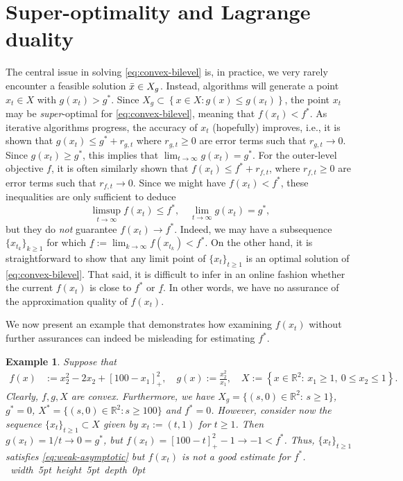 \documentclass[11pt,oneside]{article}
\theoremstyle{plain}
\theoremstyle{plain}
\newtheorem{example}{Example}
\theoremstyle{plain}%
\newcommand{\epr}{\hfill\hbox{\hskip 4pt \vrule width 5pt height 5pt depth 0pt}\vspace{0.0cm}\par}
\newcommand{\set}[1]{\left\{#1\right\}}
\def\R{{\mathbb{R}}}
\def\bbR{{\mathbb{R}}}
\begin{document}
{\section{Super-optimality and Lagrange duality}\label{sec:lagrange-dual}

The central issue in solving \cref{eq:convex-bilevel} is, in practice, we very rarely encounter a feasible solution $\Bar{x} \in X_g$. Instead, algorithms will generate a point $x_t \in X$ with $g(x_t) > g^*$. Since $X_g \subset \left\{ x \in X : g(x) \leq g(x_t) \right\}$, the point $x_t$ may be \emph{super}-optimal for \cref{eq:convex-bilevel}, meaning that $f(x_t) < f^*$. As iterative algorithms progress, the accuracy of $x_t$ (hopefully) improves, i.e., it is shown that $g(x_t) \leq g^* + r_{g,t}$ where $r_{g,t} \geq 0$ are error terms such that $r_{g,t} \to 0$. Since $g(x_t) \geq g^*$, this implies that $\lim_{t \to \infty} g(x_t) = g^*$. For the outer-level objective $f$, it is often similarly shown that $f(x_t) \leq f^* + r_{f,t}$, where $r_{f,t} \geq 0$ are error terms such that $r_{f,t} \to 0$. Since we might have $f(x_t) < f^*$, these inequalities are only sufficient to deduce
\begin{equation} \label{eq:weak-asymptotic}
\limsup_{t \to \infty} f(x_t)\leq f^*, \quad \lim_{t \to \infty} g(x_t) = g^*,
\end{equation}
but they do \emph{not} guarantee $f(x_t) \to f^*$. Indeed, we may have a subsequence $\{x_{t_k}\}_{k \geq 1}$ for which $\underline{f} := \lim_{k \to \infty} f(x_{t_k}) < f^*$. On the other hand, it is straightforward to show that any limit point of $\{x_t\}_{t \geq 1}$ is an optimal solution of \cref{eq:convex-bilevel}. That said, it is difficult to infer in an online fashion whether the current $f(x_t)$ is close to $f^*$ or $\underline{f}$. In other words, we have no assurance of the approximation quality of $f(x_t)$.

We now present an example that demonstrates how examining $f(x_t)$ without further assurances can indeed be misleading for estimating $f^*$.
\begin{example}\label{ex:counter-example}
Suppose that
\begin{equation}\label{eq:counter}
	\begin{aligned}
		f(x)&:=x_2^2-2x_2 + [100-x_1]_+^2,\quad
		g(x):= \frac{x_2^2}{x_1}, \quad X := \set{x \in \R^2:\, x_1 \geq 1,~ 0 \leq x_2 \leq 1}.
	\end{aligned}
\end{equation}
Clearly, $f,g,X$ are convex. Furthermore, we have $X_g = \{(s,0) \in \R^2 :\, s \geq 1\}$, $g^* = 0$, $X^* = \{ (s,0) \in \bbR^2 : s \geq 100 \}$ and $f^* = 0$. However, consider now the sequence $\{x_t\}_{t \geq 1} \subset X$ given by $x_t := (t,1)$ for $t \geq 1$. Then $g(x_t) = 1/t \to 0 = g^*$, but $f(x_t) = [100-t]_+^2 - 1 \to -1 < f^*$. Thus, $\{x_t\}_{t \geq 1}$ satisfies \cref{eq:weak-asymptotic} but $f(x_t)$ is not a good estimate for $f^*$.
\epr
\end{example}

}
\end{document}
